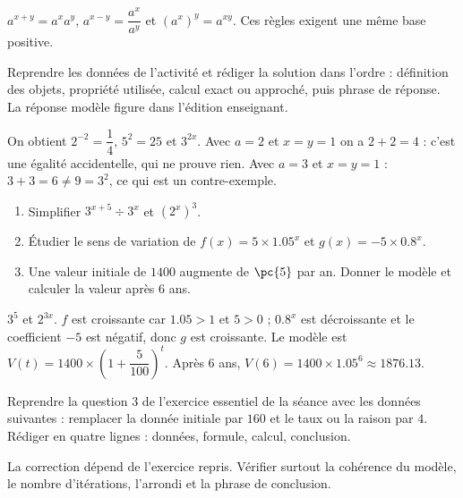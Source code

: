 \begin{summary}$a^{x+y}=a^xa^y$, $a^{x-y}=\dfrac{a^x}{a^y}$ et $(a^x)^y=a^{xy}$. Ces règles exigent une même base positive.\end{summary}

\begin{example}
Reprendre les données de l'activité et rédiger la solution dans l'ordre : définition des objets, propriété utilisée, calcul exact ou approché, puis phrase de réponse. La réponse modèle figure dans l'édition enseignant.
\end{example}
\begin{solution}On obtient $2^{-2}=\dfrac14$, $5^2=25$ et $3^{2x}$. Avec $a=2$ et $x=y=1$ on a $2+2=4$ : c'est une égalité accidentelle, qui ne prouve rien. Avec $a=3$ et $x=y=1$ : $3+3=6\neq9=3^{2}$, ce qui est un contre-exemple.\end{solution}

\begin{exercise}[essentiel]
\begin{enumerate}\item Simplifier $3^{x+5}\div3^x$ et $(2^x)^3$.\item Étudier le sens de variation de $f(x)=5\times\num{1,05}^x$ et $g(x)=-5\times\num{0,8}^x$.\item Une valeur initiale de $1400$ augmente de $\pc{5}$ par an. Donner le modèle et calculer la valeur après $6$ ans.\end{enumerate}
\end{exercise}
\begin{solution}$3^5$ et $2^{3x}$. $f$ est croissante car $\num{1,05}>1$ et $5>0$ ; $\num{0,8}^x$ est décroissante et le coefficient $-5$ est négatif, donc $g$ est croissante. Le modèle est $V(t)=1400\times\left(1+\dfrac{5}{100}\right)^t$. Après $6$ ans, $V(6)=1400\times\num{1,05}^6\approx\num{1876,13}$.\end{solution}


\begin{homework}Reprendre la question 3 de l'exercice essentiel de la séance avec les données suivantes : remplacer la donnée initiale par $160$ et le taux ou la raison par $4$. Rédiger en quatre lignes : données, formule, calcul, conclusion.\end{homework}
\begin{solution}La correction dépend de l'exercice repris. Vérifier surtout la cohérence du modèle, le nombre d'itérations, l'arrondi et la phrase de conclusion.\end{solution}

